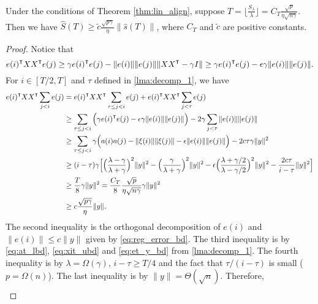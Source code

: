 \begin{lemma}
\label{lma:ST_sT}
Under the conditions of Theorem \ref{thm:lin_align}, suppose $T = \lfloor \frac{S_\lambda}{\lambda} \rfloor = C_T\frac{\sqrt{p}}{\eta\sqrt{n\gamma}}$. Then we have $\hat{S}(T) \geq \tilde{c}\frac{\sqrt {p\gamma}}{\eta}\|\hat{s}(T)\|$, where $C_T$ and $\tilde{c}$ are positive constants.
\end{lemma}
\begin{proof}
Notice that
\begin{equation*}
    e(i)\transpose XX\transpose e(j) \geq \gamma e(i)\transpose e(j) - \|e(i)\|\|e(j)\|\|XX\transpose-\gamma I\| \geq \gamma e(i)\transpose e(j) - \epsilon\gamma\|e(i)\|\|e(j)\|.
\end{equation*}
For $i\in[T/2,T]$ and $\tau$ defined in \cref{lma:decomp_1}, we have
\begin{equation}
\label{eq:eXXe}
\begin{aligned}
    e(i)\transpose XX\transpose \sum_{j<i}e(j)
    &= e(i)\transpose XX\transpose \sum_{\tau\leq j<i}e(j) + e(i)\transpose XX\transpose \sum_{j<\tau}e(j) \\
    &\geq \sum_{\tau\leq j<i}\Big(\gamma e(i)\transpose e(j) - \epsilon\gamma\|e(i)\|\|e(j)\|\Big) - 2\gamma \sum_{j<\tau}\|e(i)\|\|e(j)\| \\
    &\geq \sum_{\tau\leq j<i}\gamma\Big(a(i)a(j) - \|\xi(i)\|\|\xi(j)\| - \epsilon\|e(i)\|\|e(j)\|\Big) - 2c\tau\gamma \|y\|^2 \\
    &\geq (i-\tau)\gamma\Big[\Big(\frac{\lambda-\gamma}{\lambda+\gamma}\Big)^2\|y\|^2-\Big(\frac{\gamma}{\lambda+\gamma}\Big)^2\|y\|^2-\epsilon\Big(\frac{\lambda+\gamma/2}{\lambda-\gamma/2}\Big)^2\|y\|^2- \frac{2c\tau}{i-\tau}\|y\|^2\Big] \\
    &\geq \frac{T}{8}\gamma\|y\|^2 = \frac{C_T}{8}\frac{\sqrt{p}}{\eta\sqrt{n\gamma}}\gamma\|y\|^2 \\
    &\geq c\frac{\sqrt{p\gamma}}{\eta}\|y\|.
\end{aligned}
\end{equation}
The second inequality is the orthogonal decomposition of $e(i)$ and $\|e(i)\|\leq c\|y\|$ given by \eqref{eq:reg_error_bd}. The third inequality is by \eqref{eq:at_lbd}, \eqref{eq:xit_ubd} and \eqref{eq:et_y_bd} from \cref{lma:decomp_1}. The fourth inequality is by $\lambda=\Omega(\gamma)$, $i-\tau \geq T/4$ and the fact that $\tau/(i-\tau)$ is small ($p=\Omega(n)$). The last inequality is by $\|y\|=\Theta(\sqrt n)$. Therefore,
\begin{equation*}
\begin{aligned}

\end{aligned}
\end{equation*}
\end{proof}
